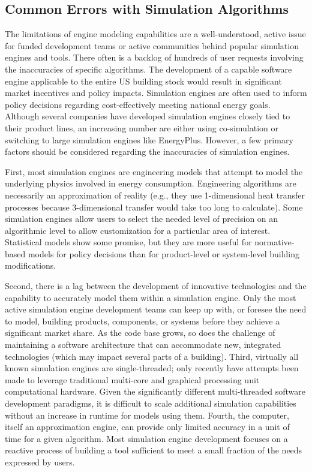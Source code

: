 \documentclass[preprint, review, 12pt]{elsarticle}
\begin{document}
\subsection{Common Errors with Simulation Algorithms}
The limitations of engine modeling capabilities are a well-understood, active issue for funded development teams or active communities behind popular simulation engines and tools. There often is a backlog of hundreds of user requests involving the inaccuracies of specific algorithms. The development of a capable software engine applicable to the entire US building stock would result in significant market incentives and policy impacts. Simulation engines are often used to inform policy decisions regarding cost-effectively meeting national energy goals. Although several companies have developed simulation engines closely tied to their product lines, an increasing number are either using co-simulation or switching to large simulation engines like EnergyPlus. However, a few primary factors should be considered regarding the inaccuracies of simulation engines.

First, most simulation engines are engineering models that attempt to model the underlying physics involved in energy consumption. Engineering algorithms are necessarily an approximation of reality (e.g., they use 1-dimensional heat transfer processes because 3-dimensional transfer would take too long to calculate). Some simulation engines allow users to select the needed level of precision on an algorithmic level to allow customization for a particular area of interest. Statistical models show some promise, but they are more useful for normative-based models for policy decisions than for product-level or system-level building modifications. 

Second, there is a lag between the development of innovative technologies and the capability to accurately model them within a simulation engine. Only the most active simulation engine development teams can keep up with, or foresee the need to model, building products, components, or systems before they achieve a significant market share. As the code base grows, so does the challenge of maintaining a software architecture that can accommodate new, integrated technologies (which may impact several parts of a building). Third, virtually all known simulation engines are single-threaded; only recently have attempts been made to leverage traditional multi-core and graphical processing unit computational hardware. Given the significantly different multi-threaded software development paradigms, it is difficult to scale additional simulation capabilities without an increase in runtime for models using them. Fourth, the computer, itself an approximation engine, can provide only limited accuracy in a unit of time for a given algorithm. Most simulation engine development focuses on a reactive process of building a tool sufficient to meet a small fraction of the needs expressed by users.
\end{document}

